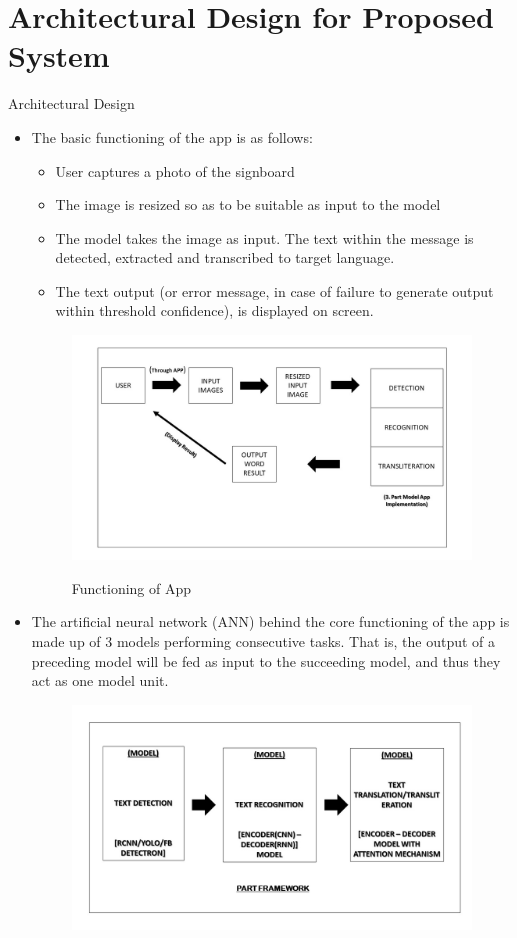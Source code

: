 \documentclass{beamer}
\begin{document}
\section{Architectural Design for Proposed System}
	\begin{frame}[allowframebreaks]{Architectural Design}
	\begin{itemize}
		\item The basic functioning of the app is as follows:
		\begin{itemize}
			\item User captures a photo of the signboard
			\item The image is resized so as to be suitable as input to the model
			\item The model takes the image as input. The text within the message is detected, extracted and transcribed to target language.
			\item The text output (or error message, in case of failure to generate output within threshold confidence), is displayed on screen.
		\end{itemize}
		 \begin{figure}
				{\includegraphics[scale=.3]{Slide2}}
				\caption{Functioning of App}
				\label{Slide2}
		\end{figure}
		\item The artificial neural network (ANN) behind the core functioning of the app is made up of 3 models performing consecutive tasks. That is, the output of a preceding model will be fed as input to the succeeding model, and thus they act as one model unit.
		\begin{figure}
				{\includegraphics[scale=.3]{Slide1}}

\end{figure}
\end{itemize}
\end{frame}
\end{document}
